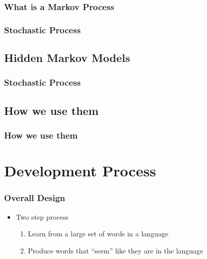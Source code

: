 \documentclass{beamer}
\begin{document}
\begin{frame}
   \frametitle{What is a Markov Process}
\end{frame}

\begin{frame}
   \frametitle{}
\end{frame}

\begin{frame}
   \frametitle{Stochastic Process}
\end{frame}

\subsection{Hidden Markov Models}
\begin{frame}
   \frametitle{}
\end{frame}

\begin{frame}
   \frametitle{Stochastic Process}
\end{frame}

\subsection{How we use them}
\begin{frame}
   \frametitle{How we use them}
\end{frame}

\section{Development Process}

\begin{frame}
   \frametitle{Overall Design}
   \begin{itemize}
      \item Two step process
      \begin{enumerate}
         \item Learn from a large set of words in a language
         \item Produce words that ``seem'' like they are in the language
      \end{enumerate}
   \end{itemize}
\end{frame}
\end{document}
